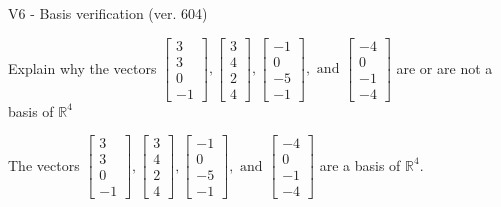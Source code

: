 \begin{exercise}
  \begin{exerciseTitle}V6 - Basis verification (ver. 604)\end{exerciseTitle}
  \begin{exerciseStatement}
    Explain why the vectors \(\left[\begin{array}{r}
3 \\
3 \\
0 \\
-1
\end{array}\right] , \left[\begin{array}{r}
3 \\
4 \\
2 \\
4
\end{array}\right] , \left[\begin{array}{r}
-1 \\
0 \\
-5 \\
-1
\end{array}\right] , \text{ and } \left[\begin{array}{r}
-4 \\
0 \\
-1 \\
-4
\end{array}\right]\) are or are not a basis of \(\mathbb{R}^4\)	


  \end{exerciseStatement}
  \begin{exerciseAnswer}
   The vectors \(\left[\begin{array}{r}
3 \\
3 \\
0 \\
-1
\end{array}\right] , \left[\begin{array}{r}
3 \\
4 \\
2 \\
4
\end{array}\right] , \left[\begin{array}{r}
-1 \\
0 \\
-5 \\
-1
\end{array}\right] , \text{ and } \left[\begin{array}{r}
-4 \\
0 \\
-1 \\
-4
\end{array}\right]\) 
  	 are  a basis of \(\mathbb{R}^4\).
  


  \end{exerciseAnswer}
\end{exercise}